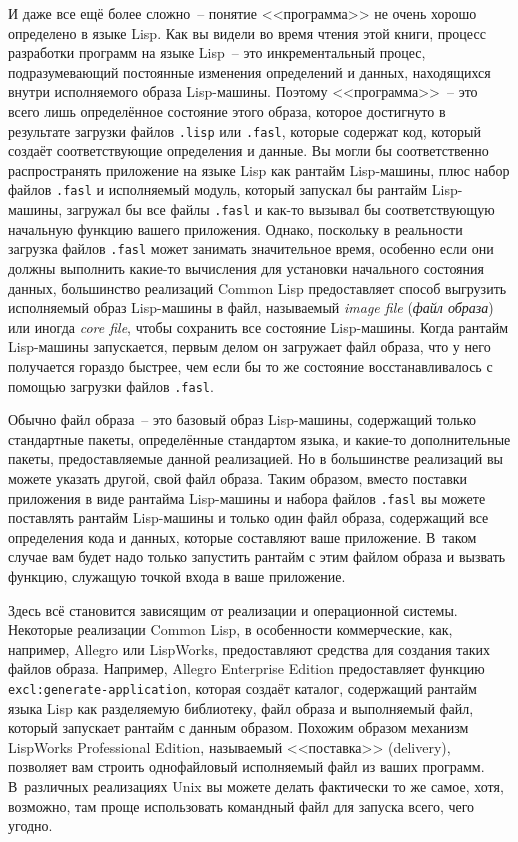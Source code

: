 И даже все ещё более сложно~-- понятие <<программа>> не очень хорошо определено в языке
Lisp. Как вы видели во время чтения этой книги, процесс разработки программ на языке
Lisp~-- это инкрементальный процес, подразумевающий постоянные изменения определений и
данных, находящихся внутри исполняемого образа Lisp-машины. Поэтому <<программа>>~-- это
всего лишь определённое состояние этого образа, которое достигнуто в результате загрузки
файлов \lstinline{.lisp} или \lstinline{.fasl}, которые содержат код, который создаёт
соответствующие определения и данные. Вы могли бы соответственно распространять приложение
на языке Lisp как рантайм Lisp-машины, плюс набор файлов \lstinline{.fasl} и исполняемый
модуль, который запускал бы рантайм Lisp-машины, загружал бы все файлы \lstinline{.fasl} и
как-то вызывал бы соответствующую начальную функцию вашего приложения. Однако, поскольку в
реальности загрузка файлов \lstinline{.fasl} может занимать значительное время, особенно если
они должны выполнить какие-то вычисления для установки начального состояния данных,
большинство реализаций Common Lisp предоставляет способ выгрузить исполняемый образ
Lisp-машины в файл, называемый \emph{image file} (\emph{файл образа}) или иногда
\emph{core file}, чтобы сохранить все состояние Lisp-машины. Когда рантайм Lisp-машины
запускается, первым делом он загружает файл образа, что у него получается гораздо быстрее,
чем если бы то же состояние восстанавливалось с помощью загрузки файлов \lstinline{.fasl}.

Обычно файл образа~-- это базовый образ Lisp-машины, содержащий только стандартные пакеты,
определённые стандартом языка, и какие-то дополнительные пакеты, предоставляемые данной
реализацией. Но в большинстве реализаций вы можете указать другой, свой файл образа. Таким
образом, вместо поставки приложения в виде рантайма Lisp-машины и набора файлов
\lstinline{.fasl} вы можете поставлять рантайм Lisp-машины и только один файл образа,
содержащий все определения кода и данных, которые составляют ваше приложение. В~таком
случае вам будет надо только запустить рантайм с этим файлом образа и вызвать функцию,
служащую точкой входа в ваше приложение.

Здесь всё становится зависящим от реализации и операционной системы. Некоторые реализации
Common Lisp, в особенности коммерческие, как, например, Allegro или LispWorks, предоставляют
средства для создания таких файлов образа. Например, Allegro Enterprise Edition
предоставляет функцию \lstinline{excl:generate-application}, которая создаёт каталог,
содержащий рантайм языка Lisp как разделяемую библиотеку, файл образа и выполняемый файл,
который запускает рантайм с данным образом. Похожим образом механизм LispWorks
Professional Edition, называемый <<поставка>> (delivery), позволяет вам строить
однофайловый исполняемый файл из ваших программ. В~различных реализациях Unix вы можете
делать фактически то же самое, хотя, возможно, там проще использовать командный файл для
запуска всего, чего угодно.

